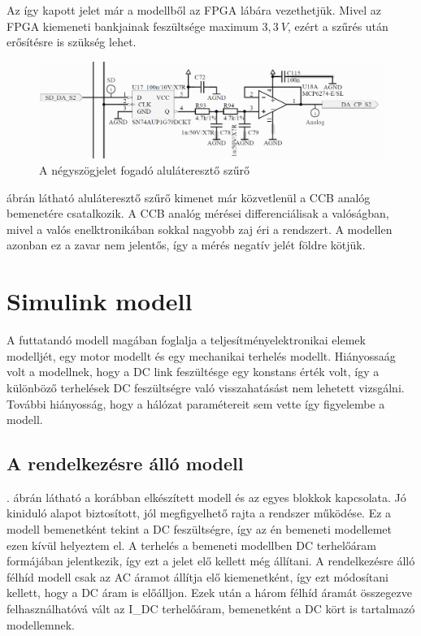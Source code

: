 Az így kapott jelet már a modellből az FPGA lábára vezethetjük. Mivel az FPGA kiemeneti bankjainak feszültsége maximum $3,3\ V$, ezért a szűrés után erősítésre is szükség lehet.

\begin{figure}[!h]
	\centering
	\includegraphics[width = \textwidth]{figures/lowpassfilter.png}
	\caption{A négyszögjelet fogadó aluláteresztő szűrő} 
	\label{fig:lowpass}
\end{figure}

 ábrán látható aluláteresztő szűrő kimenet már közvetlenül a CCB analóg bemenetére csatalkozik. A CCB analóg mérései differenciálisak a valóságban, mivel a valós enelktronikában sokkal nagyobb zaj éri a rendszert. A modellen azonban ez a zavar nem jelentős, így a mérés negatív jelét földre kötjük.

\section{Simulink modell}

A futtatandó modell magában foglalja a teljesítményelektronikai elemek modelljét, egy motor modellt és egy mechanikai terhelés modellt. Hiányossaág volt a modellnek, hogy a DC link feszültésge egy konstans érték volt, így a különböző terhelések DC feszültségre való visszahatásást nem lehetett vizsgálni. További hiányosság, hogy a hálózat paramétereit sem vette így figyelembe a modell.

\subsection{A rendelkezésre álló modell}

. ábrán látható a korábban elkészített modell és az egyes blokkok kapcsolata. Jó kiniduló alapot biztosított, jól megfigyelhető rajta a rendszer működése. Ez a modell bemenetként tekint a DC feszültségre, így az én bemeneti modellemet ezen kívül helyeztem el. A terhelés a bemeneti modellben DC terhelőáram formájában jelentkezik, így ezt a jelet elő kellett még állítani. A rendelkezésre álló félhíd modell csak az AC áramot állítja elő kiemenetként, így ezt módosítani kellett, hogy a DC áram is előálljon. Ezek után a három félhíd áramát összegezve felhasználhatóvá vált az I_{DC} terhelőáram, bemenetként a DC kört is tartalmazó modellemnek.


